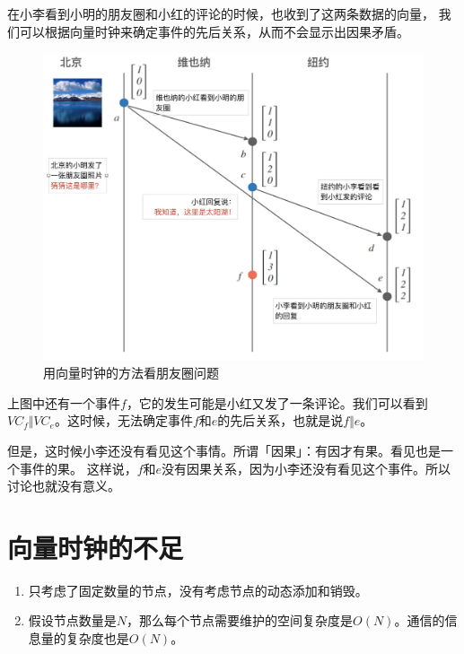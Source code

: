 \documentclass[cn,11pt,chinese]{elegantbook}
\providecommand{\tightlist}{%
  \setlength{\itemsep}{0pt}\setlength{\parskip}{0pt}}
\begin{document}
在小李看到小明的朋友圈和小红的评论的时候，也收到了这两条数据的向量，
我们可以根据向量时钟来确定事件的先后关系，从而不会显示出因果矛盾。

\begin{figure}
\centering
\includegraphics{images/appendix-a-17.jpeg}
\caption{用向量时钟的方法看朋友圈问题}
\end{figure}

上图中还有一个事件\(f\)，它的发生可能是小红又发了一条评论。我们可以看到\(VC_f \Vert VC_e\)。这时候，无法确定事件\(f\)和\(e\)的先后关系，也就是说\(f \Vert e\)。

但是，这时候小李还没有看见这个事情。所谓「因果」：有因才有果。看见也是一个事件的果。
这样说，\(f\)和\(e\)没有因果关系，因为小李还没有看见这个事件。所以讨论也就没有意义。

\hypertarget{ux5411ux91cfux65f6ux949fux7684ux4e0dux8db3}{%
\section{向量时钟的不足}\label{ux5411ux91cfux65f6ux949fux7684ux4e0dux8db3}}

\begin{enumerate}
\def\labelenumi{\arabic{enumi}.}
\tightlist
\item
  只考虑了固定数量的节点，没有考虑节点的动态添加和销毁。
\item
  假设节点数量是\(N\)，那么每个节点需要维护的空间复杂度是\(O(N)\)。通信的信息量的复杂度也是\(O(N)\)。
\end{enumerate}
\end{document}
